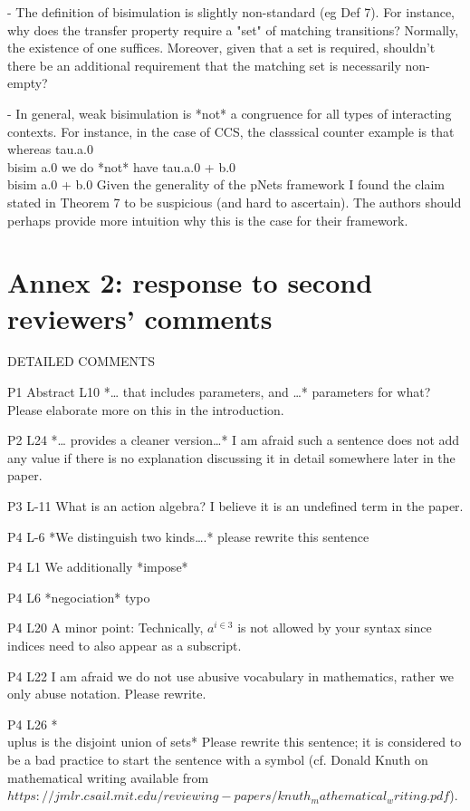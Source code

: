 \documentclass{article}
\begin{document}
- The definition of bisimulation is slightly non-standard (eg Def 7).  For instance, why does the transfer property require a "set" of matching transitions?  Normally, the existence of one suffices.  Moreover, given that a set is required, shouldn't there be an additional requirement that the matching set is necessarily non-empty? 

- In general, weak bisimulation is *not* a congruence for all types of interacting contexts.  For instance, in the case of CCS, the classsical counter example is that whereas 
tau.a.0  \\bisim  a.0
we do *not* have
tau.a.0 + b.0 \\bisim  a.0 + b.0 
Given the generality of the pNets framework I found the claim stated in Theorem 7 to be suspicious (and hard to ascertain).  The authors should perhaps provide more intuition why this is the case for their framework.


\section*{Annex 2: response to second reviewers' comments}
DETAILED COMMENTS

P1 Abstract L10 *… that includes parameters, and …* parameters for what? Please elaborate more on this in the introduction.

P2 L24 *… provides a cleaner version…* I am afraid such a sentence does not add any value if there is no explanation discussing it in detail somewhere later in the paper.

P3 L-11 What is an action algebra? I believe it is an undefined term in the paper.

P4 L-6 *We distinguish two kinds….* please rewrite this sentence

P4 L1 We additionally *impose*

P4 L6 *negociation* typo

P4 L20 A minor point: Technically, $a^{i\in 3}$ is not allowed by your syntax since indices need to also appear as a subscript.

P4 L22 I am afraid we do not use abusive vocabulary in mathematics, rather we only abuse notation. Please rewrite.

P4 L26 *\\uplus is the disjoint union of sets* Please rewrite this sentence; it is considered to be a bad practice to start the sentence with a symbol (cf. Donald Knuth on mathematical writing available from $https://jmlr.csail.mit.edu/reviewing-papers/knuth_mathematical_writing.pdf$).
\end{document}
